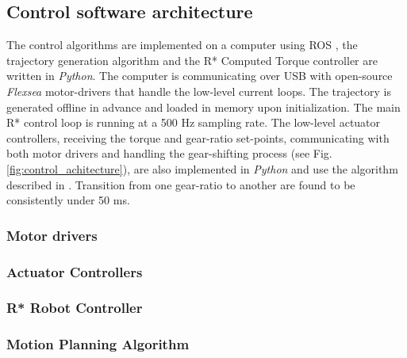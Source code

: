



\subsection{Control software architecture}
\label{sec:ControlSoftwareArchitecture}

The control algorithms are implemented on a computer using ROS \cite{quigley_ros:_2009}, the trajectory generation algorithm and the R* Computed Torque controller are written in \textit{Python}. The computer is communicating over USB with open-source \textit{Flexsea} motor-drivers \cite{duval_flexsea-execute:_2016} that handle the low-level current loops. The trajectory is generated offline in advance and loaded in memory upon initialization. The main R* control loop is running at a 500 Hz sampling rate. The low-level actuator controllers, receiving the torque and gear-ratio set-points, communicating with both motor drivers and handling the gear-shifting process (see Fig. \ref{fig:control_achitecture}), are also implemented in \textit{Python} and use the algorithm described in \cite{girard_two-speed_2015}. Transition from one gear-ratio to another are found to be consistently under 50 ms.

\subsubsection{Motor drivers}

\subsubsection{Actuator Controllers}

\subsubsection{R* Robot Controller}

\subsubsection{Motion Planning Algorithm}


